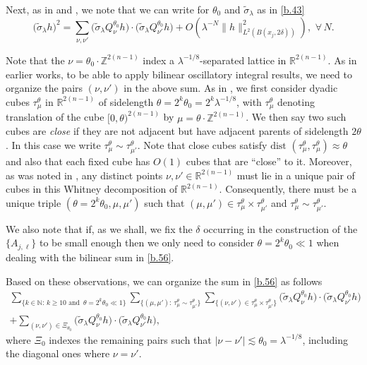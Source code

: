 \documentclass[10pt]{amsart}
\newcommand{\la}{\lambda}
\newcommand{\1}{{\bf 1}}
\begin{document}
Next, as in \cite{BHSsp} and \cite{HSp}, we note that we can write for $\theta_0$ and $\tilde \sigma_\la$ as in \eqref{b.43}
\begin{equation}\label{b.56}
\bigl(\tilde \sigma_\la h\bigr)^2 =
\sum_{\nu,\nu'}
\bigl(\tilde \sigma_\la Q^{\theta_0}_\nu h\bigr)\cdot 
\bigl(\tilde \sigma_\la Q^{\theta_0}_{\nu'}h\bigr) +O(\la^{-N}\|h\|^2_{L^2(B(x_j,2\delta))}), \, \, \forall \, N.
\end{equation}


Note that the $\nu=\theta_0\cdot {\mathbb Z}^{2(n-1)}$ index a $\la^{-1/8}$-separated lattice in ${\mathbb R}^{2(n-1)}$.   As
in earlier works, to be able to apply bilinear oscillatory integral results, we need to organize the pairs $(\nu,\nu')$ in
the above sum.  As in \cite{TaoVargasVega}, we first consider dyadic cubes $\tau^\theta_\mu$ in 
${\mathbb R}^{2(n-1)}$ of sidelength $\theta=2^k\theta_0=2^k\la^{-1/8}$, with $\tau^\theta_\mu$ denoting translation of the cube
$[0,\theta)^{2(n-1)}$ by $\mu=\theta\cdot {\mathbb Z}^{2(n-1)}$.  We then say two such cubes are {\em close} if they are not
adjacent but have adjacent parents of sidelength $2\theta$.  In this case we write $\tau^\theta_\mu \sim \tau^\theta_{\mu'}$.  Note that
close cubes satisfy $\text{dist }(\tau^\theta_\mu,\tau^\theta_{\mu})\approx \theta$ and also that each fixed cube has
$O(1)$ cubes that are ``close'' to it.  Moreover, as was noted in \cite{TaoVargasVega}, any distinct points
$\nu,\nu'\in {\mathbb R}^{2(n-1)}$ must lie in a unique pair of cubes in this Whitney decomposition of ${\mathbb R}^{2(n-1)}$.
Consequently, there must be a unique triple $(\theta=2^k\theta_0, \mu,\mu')$ such that
$(\mu,\mu')\in \tau^\theta_\mu\times \tau^\theta_{\mu'}$ and $\tau^\theta_{\mu}\sim \tau^\theta_{\mu'}$.


We also note that if, as we shall, we fix the $\delta$ occurring in the construction of the $\{A_{j,\ell}\}$ to be small enough
then we only need to consider $\theta=2^k\theta_0\ll 1$ when dealing with the bilinear sum in \eqref{b.56}.


Based on these observations, we can organize the sum in \eqref{b.56} as follows
\begin{multline}\label{b.57}
\sum_{\{k\in {\mathbb N}: \, k\ge 10 \, \, \text{and } \, 
\theta=2^k\theta_0\ll 1\}}
\sum_{\{(\mu, \mu'): \, \tau^\theta_\mu
\sim \tau^\theta_{ \mu'}\}}
\sum_{\{(\nu, \nu')\in
\tau^\theta_\mu\times \tau^\theta_{ \mu'}\}}
\bigl(\tilde \sigma_\la
Q^{\theta_0}_\nu h\bigr) 
\cdot \bigl(\tilde \sigma_\la
Q^{\theta_0}_{ \nu'} h\bigr)
\\
+\sum_{(\nu, \nu')\in \Xi_{\theta_0}} 
\bigl( \tilde \sigma_\la Q^{\theta_0}_\nu h\bigr) 
\cdot \bigl( \tilde \sigma_\la
Q^{\theta_0}_{ \nu'} 
h\bigr)
,
\end{multline}
where $\Xi_0$ indexes the remaining pairs such that $|\nu-\nu'|\lesssim \theta_0=\la^{-1/8}$, including the diagonal ones
where $\nu=\nu'$.
\end{document}
